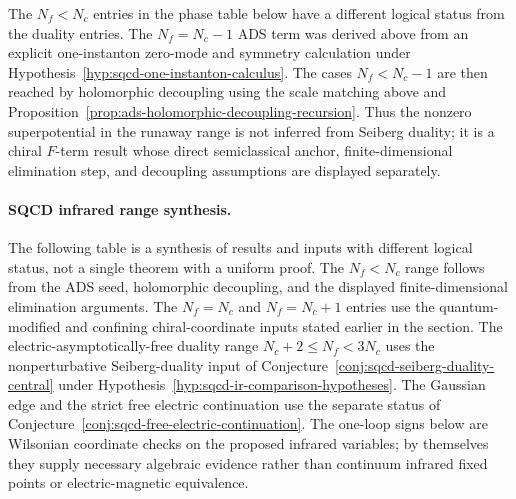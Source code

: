 The \(N_f<N_c\) entries in the phase table below have a different logical
status from the duality entries.  The \(N_f=N_c-1\) ADS term was derived
above from an explicit one-instanton zero-mode and symmetry calculation under
Hypothesis~\ref{hyp:sqcd-one-instanton-calculus}.  The cases
\(N_f<N_c-1\) are then reached by holomorphic decoupling using
the scale matching above and
Proposition~\ref{prop:ads-holomorphic-decoupling-recursion}.  Thus the nonzero
superpotential in the runaway range is not inferred from Seiberg duality; it
is a chiral \(F\)-term result whose direct semiclassical anchor,
finite-dimensional elimination step, and decoupling assumptions are
displayed separately.

\paragraph{SQCD infrared range synthesis.}
\label{par:sqcd-infrared-range-synthesis}
The following table is a synthesis of results and inputs with different
logical status, not a single theorem with a uniform proof.  The
\(N_f<N_c\) range follows from the ADS seed, holomorphic decoupling, and the
displayed finite-dimensional elimination arguments.  The \(N_f=N_c\) and
\(N_f=N_c+1\) entries use the quantum-modified and confining chiral-coordinate
inputs stated earlier in the section.  The electric-asymptotically-free
duality range \(N_c+2\leq N_f<3N_c\) uses the nonperturbative
Seiberg-duality input of
Conjecture~\ref{conj:sqcd-seiberg-duality-central} under
Hypothesis~\ref{hyp:sqcd-ir-comparison-hypotheses}.  The Gaussian edge and
the strict free electric continuation use the separate status of
Conjecture~\ref{conj:sqcd-free-electric-continuation}.  The one-loop signs
below are Wilsonian coordinate checks on the proposed infrared variables; by
themselves they supply necessary algebraic evidence rather than continuum
infrared fixed points or electric-magnetic equivalence.
